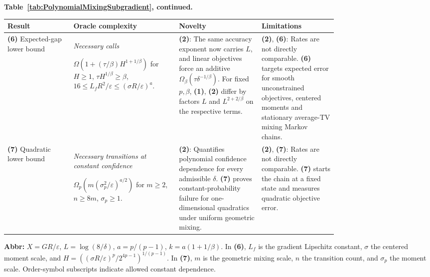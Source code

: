 \clearpage
\begin{table}[tp]
\centering
\parbox{\linewidth}{\footnotesize\textbf{Table~\ref{tab:PolynomialMixingSubgradient}, continued.}}\par\smallskip
\begin{threeparttable}
\footnotesize
\setlength{\tabcolsep}{4pt}\renewcommand{\arraystretch}{1.25}
\begin{tabularx}{\linewidth}{@{}>{\raggedright\arraybackslash}p{0.20\linewidth}>{\raggedright\arraybackslash}p{0.32\linewidth}>{\raggedright\arraybackslash}p{0.25\linewidth}>{\raggedright\arraybackslash}X@{}}
\toprule
\textbf{Result} & \textbf{Oracle complexity} & \textbf{Novelty} & \textbf{Limitations} \\
\midrule
\textbf{(6)} Expected-gap lower bound \citep{pmsEarlierLower}
& \textit{Necessary calls}\par $\Omega\!\left(1+(\tau/\beta)H^{1+1/\beta}\right)$ for $H\ge1$, $\tau H^{1/\beta}\ge\beta$, $16\le L_fR^2/\varepsilon\le(\sigma R/\varepsilon)^a$.
& \textbf{(2)}: The same accuracy exponent now carries $L$, and linear objectives force an additive $\Omega_{\beta}(\tau\delta^{-1/\beta})$. For fixed $p,\beta$, \textbf{(1)}, \textbf{(2)} differ by factors $L$ and $L^{2+2/\beta}$ on the respective terms.
& \textbf{(2)}, \textbf{(6)}: Rates are not directly comparable. \textbf{(6)} targets expected error for smooth unconstrained objectives, centered moments and stationary average-TV mixing Markov chains. \\
\midrule
\textbf{(7)} Quadratic lower bound \citep[Thm.~4]{pmhtSarkar2026v1}
& \textit{Necessary transitions at constant confidence}\par $\Omega_p\!\left(m(\sigma_p^2/\varepsilon)^{a/2}\right)$ for $m\ge2$, $n\ge8m$, $\sigma_p\ge1$.
& \textbf{(2)}: Quantifies polynomial confidence dependence for every admissible $\delta$. \textbf{(7)} proves constant-probability failure for one-dimensional quadratics under uniform geometric mixing.
& \textbf{(2)}, \textbf{(7)}: Rates are not directly comparable. \textbf{(7)} starts the chain at a fixed state and measures quadratic objective error. \\
\bottomrule
\end{tabularx}
\begin{tablenotes}[flushleft]\footnotesize
\item[] \textbf{Abbr:} $X=GR/\varepsilon$, $L=\log(8/\delta)$, $a=p/(p-1)$, $k=a(1+1/\beta)$. In \textbf{(6)}, $L_f$ is the gradient Lipschitz constant, $\sigma$ the centered moment scale, and $H=((\sigma R/\varepsilon)^p/2^{4p-1})^{1/(p-1)}$. In \textbf{(7)}, $m$ is the geometric mixing scale, $n$ the transition count, and $\sigma_p$ the moment scale. Order-symbol subscripts indicate allowed constant dependence.
\end{tablenotes}
\end{threeparttable}
\end{table}
